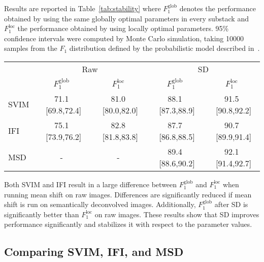 \documentclass[smallextended]{svjour3}       %
\begin{document}
Results are reported
in Table~\ref{tab:stability} where $F_1^{\mathrm{glob}}$ denotes the
performance obtained by using the same globally optimal parameters in
every substack and $F_1^{\mathrm{loc}}$ the performance obtained by
using locally optimal parameters. 95\% confidence intervals were
computed by Monte Carlo simulation, taking 10000 samples from the
$F_1$ distribution defined by the probabilistic model described
in~\cite{goutte_probabilistic_2005}.
\newcommand\ci[3]{#1 ~[#2,#3]}
\begin{table*}
  \centering
  \begin{tabular}{l c c c c}
    ~  &\multicolumn{2}{c}{Raw}& \multicolumn{2}{c}{SD} \\
    ~ & $F_1^{\mathrm{glob}}$  & $F_1^{\mathrm{loc}}$ & $F_1^{\mathrm{glob}}$ & $F_1^{\mathrm{loc}}$ \\
    \hline\noalign{\smallskip}
    SVIM& 71.1 ~[69.8,72.4]    & 81.0 ~[80.0,82.0]    & 88.1 ~[87.3,88.9]    & 91.5 ~[90.8,92.2]\\
    IFI & 75.1 ~[73.9,76.2]    & 82.8 ~[81.8,83.8]    & 87.7 ~[86.8,88.5]    & 90.7 ~[89.9,91.4]\\
    MSD& -    & -    & 89.4 ~[88.6,90.2]    & 92.1 ~[91.4,92.7]\\
  \end{tabular}
  \caption{Stability of mean shift (95\% confidence intervals in brackets).}
  \label{tab:stability}
\end{table*}
Both SVIM and IFI result in a large difference between
$F_1^{\mathrm{glob}}$ and $F_1^{\mathrm{loc}}$ when running mean shift on raw
images. Differences are significantly reduced if mean shift is run
on semantically deconvolved images. Additionally, $F_1^{\mathrm{glob}}$
after SD is significantly better than $F_1^{\mathrm{loc}}$ on raw
images. These results show that SD improves performance significantly and stabilizes it with respect to
the parameter values.


\subsection{Comparing SVIM, IFI, and MSD}
\label{sec:performance}
\end{document}
